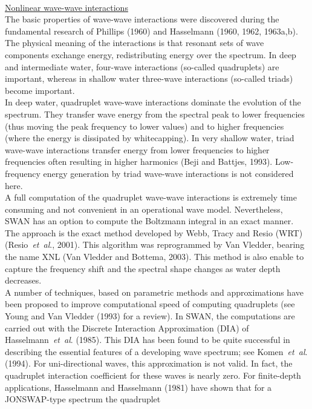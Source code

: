 \documentclass[12pt]{book}
\begin{document}
\\[2ex]
\noindent
\underline{Nonlinear wave-wave interactions}\\[2ex]
The basic properties of wave-wave interactions were discovered during the fundamental research
of Phillips (1960) and Hasselmann (1960, 1962, 1963a,b). The physical meaning of the interactions is that
resonant sets of wave components exchange energy, redistributing energy over the spectrum. In deep
and intermediate water, four-wave interactions (so-called quadruplets) are important, whereas
in shallow water three-wave interactions (so-called triads) become important.
\\[2ex]
\noindent
In deep water, quadruplet wave-wave interactions dominate the evolution of the spectrum. They transfer
wave energy from the spectral peak to lower frequencies (thus moving the peak frequency to lower values)
and to higher frequencies (where the energy is dissipated by whitecapping). In very shallow water, triad
wave-wave interactions transfer energy from lower frequencies to higher frequencies often resulting in
higher harmonics (Beji and Battjes, 1993). Low-frequency energy generation by triad wave-wave
interactions is not considered here.
\\[2ex]
\noindent
A full computation of the quadruplet wave-wave interactions is extremely time consuming and not
convenient in an operational wave model. Nevertheless, SWAN has an option to compute the Boltzmann integral
in an exact manner. The approach is the exact method developed by Webb, Tracy and Resio (WRT)
(Resio~{\it et~al}., 2001). This algorithm was reprogrammed by Van Vledder, bearing the name XNL
(Van Vledder and Bottema, 2003). This method is also enable to capture the frequency shift and the spectral
shape changes as water depth decreases.
\\[2ex]
\noindent
A number of techniques, based on parametric methods and approximations have been proposed to
improve computational speed of computing quadruplets (see Young and Van Vledder (1993) for a review). In SWAN,
the computations are carried out with the Discrete Interaction Approximation (DIA) of Hasselmann~{\it et~al}.
(1985). This DIA has been found to be quite successful in describing the essential features of a
developing wave spectrum; see Komen~{\it et~al}. (1994). For uni-directional waves, this approximation is not
valid. In fact, the quadruplet interaction coefficient for these waves is nearly zero. For finite-depth
applications, Hasselmann and Hasselmann (1981) have shown that for a JONSWAP-type spectrum the quadruplet
\end{document}
